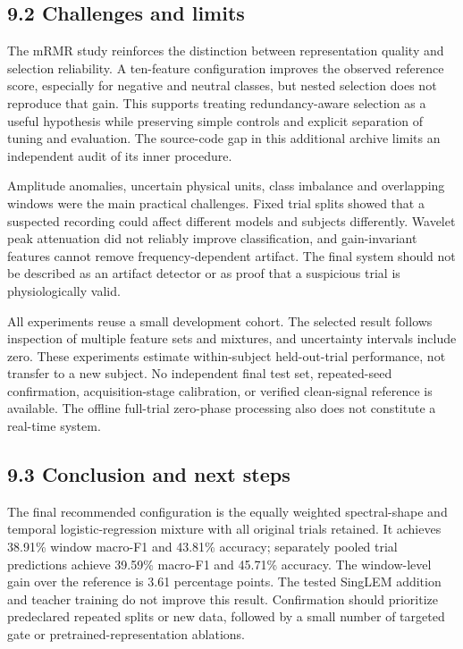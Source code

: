 \documentclass[10pt,a4paper]{article}
\begin{document}
\subsection*{9.2 Challenges and limits}

The mRMR study reinforces the distinction between representation quality and selection reliability. A ten-feature configuration improves the observed reference score, especially for negative and neutral classes, but nested selection does not reproduce that gain. This supports treating redundancy-aware selection as a useful hypothesis while preserving simple controls and explicit separation of tuning and evaluation. The source-code gap in this additional archive limits an independent audit of its inner procedure.


Amplitude anomalies, uncertain physical units, class imbalance and overlapping windows were the main practical challenges. Fixed trial splits showed that a suspected recording could affect different models and subjects differently. Wavelet peak attenuation did not reliably improve classification, and gain-invariant features cannot remove frequency-dependent artifact. The final system should not be described as an artifact detector or as proof that a suspicious trial is physiologically valid.


All experiments reuse a small development cohort. The selected result follows inspection of multiple feature sets and mixtures, and uncertainty intervals include zero. These experiments estimate within-subject held-out-trial performance, not transfer to a new subject. No independent final test set, repeated-seed confirmation, acquisition-stage calibration, or verified clean-signal reference is available. The offline full-trial zero-phase processing also does not constitute a real-time system.


\subsection*{9.3 Conclusion and next steps}

The final recommended configuration is the equally weighted spectral-shape and temporal logistic-regression mixture with all original trials retained. It achieves 38.91\% window macro-F1 and 43.81\% accuracy; separately pooled trial predictions achieve 39.59\% macro-F1 and 45.71\% accuracy. The window-level gain over the reference is 3.61 percentage points. The tested SingLEM addition and teacher training do not improve this result. Confirmation should prioritize predeclared repeated splits or new data, followed by a small number of targeted gate or pretrained-representation ablations.
\end{document}
